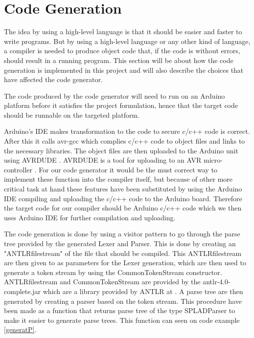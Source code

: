 \section{Code Generation}
The idea by using a high-level language is that it should be easier and faster to write programs. But by using a high-level language or any other kind of language, a compiler is needed to produce object code that, if the code is without errors, should result in a running program. This section will be about how the code generation is implemented in this project and will also describe the choices that have affected the code generator.

The code produced by the code generator will need to run on an Arduino platform before it satisfies the project formulation, hence that the target code should be runnable on the targeted platform.

Arduino's IDE makes transformation to the code to secure c/c++ code is correct. After this it calls avr-gcc which complies c/c++ code to object files and links to the necessary libraries. The object files are then uploaded to the Arduino unit using AVRDUDE \citep{Buildproc}. AVRDUDE is a tool for uploading to an AVR micro-controller \citep{AVRDUDE}. For our code generator it would be the must correct way to implement these function into the compiler itself, but because of other more critical task at hand these features have been substituted by using the Arduino IDE compiling and uploading the c/c++ code to the Arduino board. Therefore the target code for our compiler should be Arduino c/c++ code which we then uses Arduino IDE for further compilation and uploading.


The code generation is done by using a visitor pattern to go through the parse tree provided by the generated Lexer and Parser. This is done by creating an "ANTLRfilestream" of the file that should be compiled. This ANTLRfilestream are then given to as parameters for the Lexer generation, which are then used to generate a token stream by using the CommonTokenStream constructor. ANTLRfilestream and CommonTokenStream are provided by the antlr-4.0-complete.jar which are a library provided by ANTLR at \citep{DownloadANTLR}. A parse tree are then generated by creating a parser based on the token stream. This procedure have been made as a function that returns parse tree of the type SPLADParser to make it easier to generate parse trees. This function can seen on code example \ref{generatP}.

